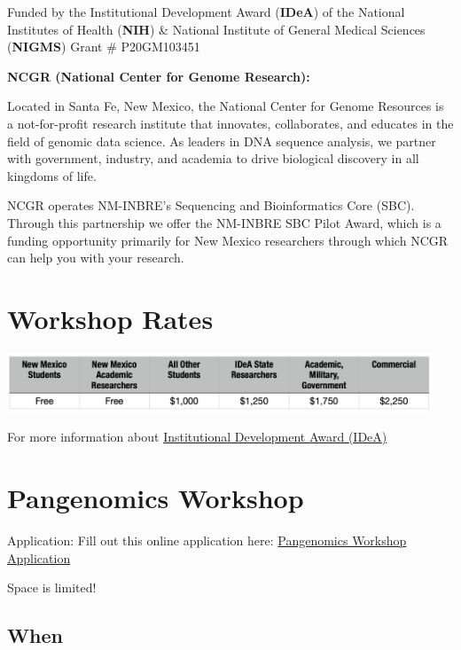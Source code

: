 \documentclass[
]{book}
\begin{document}
Funded by the Institutional Development Award (\textbf{IDeA}) of the National Institutes of Health (\textbf{NIH}) \& National Institute of General Medical Sciences (\textbf{NIGMS}) Grant \# P20GM103451

\textbf{NCGR (National Center for Genome Research):}

Located in Santa Fe, New Mexico, the National Center for Genome Resources is a not-for-profit research institute that innovates, collaborates, and educates in the field of genomic data science. As leaders in DNA sequence analysis, we partner with government, industry, and academia to drive biological discovery in all kingdoms of life.

NCGR operates NM-INBRE's Sequencing and Bioinformatics Core (SBC). Through this partnership we offer the NM-INBRE SBC Pilot Award, which is a funding opportunity primarily for New Mexico researchers through which NCGR can help you with your research.

\hypertarget{workshop-rates}{%
\chapter*{Workshop Rates}\label{workshop-rates}}

\includegraphics[width=0.95\textwidth,height=\textheight]{./Figures/Rates.png}

For more information about \href{https://www.nigms.nih.gov/capacity-building/division-for-research-capacity-building/institutional-development-award-\%28idea\%29}{Institutional Development Award (IDeA)}

\hypertarget{pangenomics-workshop}{%
\chapter*{Pangenomics Workshop}\label{pangenomics-workshop}}

Application: Fill out this online application here: \href{https://docs.google.com/forms/d/e/1FAIpQLScJPueRpT0M4CHb2RjJI5DGHTXu6mutGBVBoOMCEQsO2JnQ1A/viewform}{Pangenomics Workshop Application}

Space is limited!

\hypertarget{when-1}{%
\section*{When}\label{when-1}}
\end{document}
